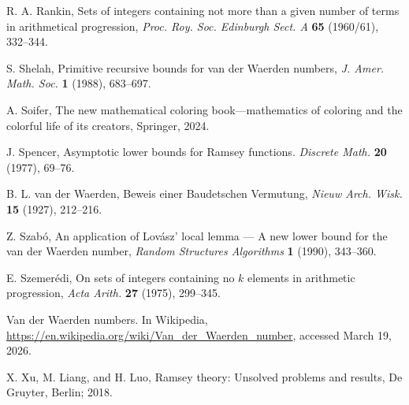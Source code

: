 \documentclass[11pt]{article}
\numberwithin{equation}{section}
\theoremstyle{definition}
\theoremstyle{remark}
\begin{document}
\begin{thebibliography}{}
R. A. Rankin, Sets of integers containing not more than a given number of terms in arithmetical progression, 
{\it Proc. Roy. Soc. Edinburgh Sect. A} {\bf 65} (1960/61), 332--344.



 S. Shelah, Primitive recursive bounds for van der Waerden numbers, {\it J. Amer. Math. Soc.} {\bf 1} (1988), 683--697.

 A. Soifer, The new mathematical coloring book---mathematics of coloring and the colorful life of its creators, Springer, 2024. 

 J. Spencer, Asymptotic lower bounds for Ramsey functions. {\it  Discrete Math.} {\bf 20} (1977), 69--76. 

 B. L. van der Waerden, Beweis einer Baudetschen Vermutung, {\it Nieuw Arch. Wisk.} {\bf 15} (1927), 212--216.

 Z. Szab\'o, An application of Lov\'asz' local lemma --- A new lower bound for the van der Waerden number, {\it Random Structures Algorithms} {\bf 1} (1990), 343--360. 

 E. Szemer\'edi, On sets of integers containing no $k$ elements in arithmetic
progression, {\it Acta Arith.} {\bf 27} (1975), 299--345.

 Van der Waerden numbers. In Wikipedia, \url{https://en.wikipedia.org/wiki/Van_der_Waerden_number}, accessed March 19, 2026. 

X. Xu, M. Liang, and H. Luo, Ramsey theory: Unsolved problems and results, De Gruyter, Berlin; 2018. 


\end{thebibliography}
\end{document}
